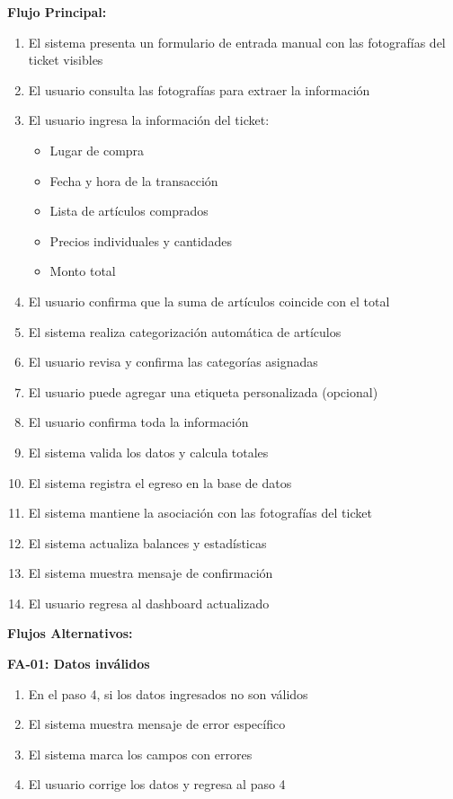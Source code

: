 \noindent\textbf{Flujo Principal:}
\begin{enumerate}
    \item El sistema presenta un formulario de entrada manual con las fotografías del ticket visibles
    \item El usuario consulta las fotografías para extraer la información
    \item El usuario ingresa la información del ticket:
    \begin{itemize}
        \item Lugar de compra
        \item Fecha y hora de la transacción
        \item Lista de artículos comprados
        \item Precios individuales y cantidades
        \item Monto total
    \end{itemize}
    \item El usuario confirma que la suma de artículos coincide con el total
    \item El sistema realiza categorización automática de artículos
    \item El usuario revisa y confirma las categorías asignadas
    \item El usuario puede agregar una etiqueta personalizada (opcional)
    \item El usuario confirma toda la información
    \item El sistema valida los datos y calcula totales
    \item El sistema registra el egreso en la base de datos
    \item El sistema mantiene la asociación con las fotografías del ticket
    \item El sistema actualiza balances y estadísticas
    \item El sistema muestra mensaje de confirmación
    \item El usuario regresa al dashboard actualizado
\end{enumerate}

\noindent\textbf{Flujos Alternativos:}

\textbf{FA-01: Datos inválidos}
\begin{enumerate}
    \item En el paso 4, si los datos ingresados no son válidos
    \item El sistema muestra mensaje de error específico
    \item El sistema marca los campos con errores
    \item El usuario corrige los datos y regresa al paso 4
\end{enumerate}

